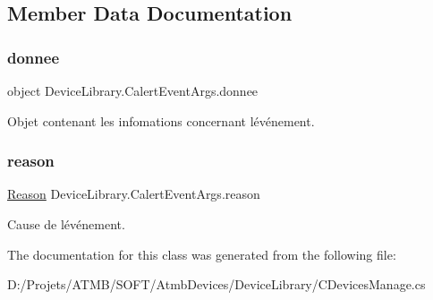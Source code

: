 \subsection{Member Data Documentation}
\mbox{\label{class_device_library_1_1_calert_event_args_a8af6a2546770e991696afd97029e57ff}} 
\subsubsection{\texorpdfstring{donnee}{donnee}}
{\footnotesize\ttfamily object Device\+Library.\+Calert\+Event\+Args.\+donnee}



Objet contenant les infomations concernant l\textquotesingle{}événement. 

\mbox{\label{class_device_library_1_1_calert_event_args_aefae78e9a96d2a95656c21c6e27fe2e6}} 
\subsubsection{\texorpdfstring{reason}{reason}}
{\footnotesize\ttfamily \mbox{\hyperlink{namespace_device_library_aecf5c8419c6482aed0b21decb1663754}{Reason}} Device\+Library.\+Calert\+Event\+Args.\+reason}



Cause de l\textquotesingle{}événement. 



The documentation for this class was generated from the following file\+:\begin{DoxyCompactItemize}
\item 
D\+:/\+Projets/\+A\+T\+M\+B/\+S\+O\+F\+T/\+Atmb\+Devices/\+Device\+Library/C\+Devices\+Manage.\+cs\end{DoxyCompactItemize}
